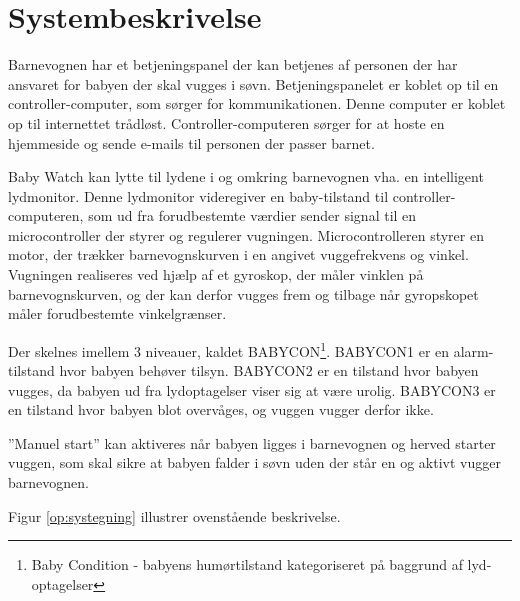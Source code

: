 \chapter{Systembeskrivelse}

Barnevognen har et betjeningspanel der kan betjenes af personen der har ansvaret for babyen der skal vugges i søvn. Betjeningspanelet er koblet op til en controller-computer, som sørger for kommunikationen. Denne computer er koblet op til internettet trådløst. Controller-computeren sørger for at hoste en hjemmeside og sende e-mails til personen der passer barnet.

Baby Watch kan lytte til lydene i og omkring barnevognen vha. en intelligent lydmonitor. Denne lydmonitor videregiver en baby-tilstand til controller-computeren, som ud fra forudbestemte værdier sender signal til en microcontroller der styrer og regulerer vugningen. Microcontrolleren styrer en motor, der trækker barnevognskurven i en angivet vuggefrekvens og vinkel. Vugningen realiseres ved hjælp af et gyroskop, der måler vinklen på barnevognskurven, og der kan derfor vugges frem og tilbage når gyropskopet måler forudbestemte vinkelgrænser.

Der skelnes imellem 3 niveauer, kaldet BABYCON\footnote{Baby Condition - babyens humørtilstand kategoriseret på baggrund af lyd-optagelser}. BABYCON1 er en alarm-tilstand hvor babyen behøver tilsyn. BABYCON2 er en tilstand hvor babyen vugges, da babyen ud fra lydoptagelser viser sig at være urolig. BABYCON3 er en tilstand hvor babyen blot overvåges, og vuggen vugger derfor ikke. 

''Manuel start'' kan aktiveres når babyen ligges i barnevognen og herved starter vuggen, som skal sikre at babyen falder i søvn uden der står en og aktivt vugger barnevognen. 

Figur \ref{op:systegning} illustrer ovenstående beskrivelse. 


